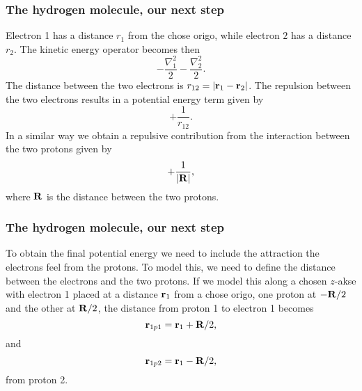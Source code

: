 \frame
{
  \frametitle{The hydrogen molecule, our next step}
\begin{small}
{\scriptsize
Electron 1 has a distance $r_1$ from the chose origo, while  electron $2$
has a distance $r_2$. 
The kinetic energy operator becomes then
\[
   -\frac{\nabla_1^2}{2}-\frac{\nabla_2^2}{2}.
\]
The distance between the two electrons is
$r_{12}=|{\bf r}_1-{\bf r}_2|$. 
The repulsion between the two electrons results in a potential energy term given by
\[
               +\frac{1}{r_{12}}.
\]
In a similar way we obtain a repulsive contribution from the interaction between the two 
protons given by
\[
               +\frac{1}{|{\bf R}|},
\]
where ${\bf R}$ is the distance between the two protons.
}
\end{small}
}


\frame
{
  \frametitle{The hydrogen molecule, our next step}
\begin{small}
{\scriptsize
To obtain the final potential energy we need to include the attraction the electrons feel from the protons.
To model this, we need to define the distance between the electrons and the two protons.
If we model this along a 
chosen $z$-akse with electron 1 placed at a distance 
${\bf r}_1$ from a chose origo, one proton at $-{\bf R}/2$
and the other at  ${\bf R}/2$, 
the distance from proton 1 to electron 1 becomes
\[
{\bf r}_{1p1}={\bf r}_1+ {\bf R}/2,
\]
and
\[
{\bf r}_{1p2}={\bf r}_1- {\bf R}/2,
\]
from proton 2.
}
\end{small}
}


